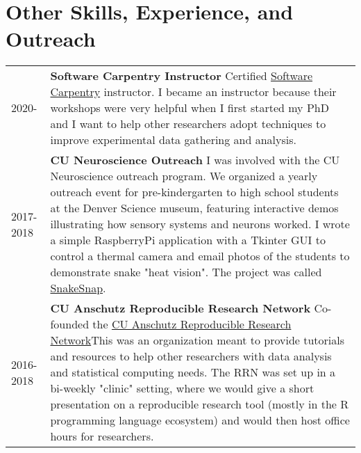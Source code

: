 \documentclass[11pt]{article}
\begin{document}
\section*{Other Skills, Experience, and Outreach}
\label{sec:org1a3da9a}
\begin{tabular}{lp{}}
2020-& \textbf{Software Carpentry Instructor} \newline Certified \href{https://software-carpentry.org/}{Software Carpentry} instructor. I became an instructor because their workshops were very helpful when I first started my PhD and I want to help other researchers adopt techniques to improve experimental data gathering and analysis.\\
2017-2018& \textbf{CU Neuroscience Outreach}\newline
I was involved with the CU Neuroscience outreach program. We organized a yearly outreach event for pre-kindergarten to high school students at the Denver Science museum, featuring interactive demos illustrating how sensory systems and neurons worked. I wrote a simple RaspberryPi application with a Tkinter GUI to control a thermal camera and email photos of the students to demonstrate snake "heat vision". The project was called \href{https://github.com/nkicg6/thermalsnap}{SnakeSnap}.\\
2016-2018& \textbf{CU Anschutz Reproducible Research Network} \newline Co-founded the \href{https://ucd-reproducible-research-clinic.github.io/members.html}{CU Anschutz Reproducible Research Network}\newline This was an organization meant to provide tutorials and resources to help other researchers with data analysis and statistical computing needs. The RRN was set up in a bi-weekly "clinic" setting, where we would give a short presentation on a reproducible research tool (mostly in the R programming language ecosystem) and would then host office hours for researchers.\\
\end{tabular}
\end{document}
